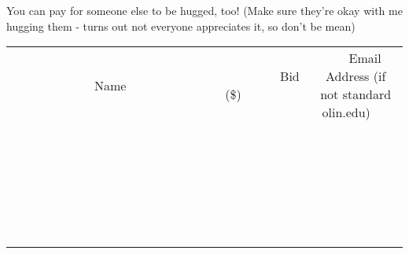 \documentclass[11pt]{article}
\begin{document}
You can pay for someone else to be hugged, too! (Make sure they're okay with me hugging them - turns out not everyone appreciates it, so don't be mean) \\
					[6ex]
					\begin{tabular}{c c c}
						~~~~~~~~~~~~~Name~~~~~~~~~~~~~ & ~~~~~~~~~Bid (\$)~~~~~~~~~ & ~~~Email Address (if not standard olin.edu)~~~ \\
				
 & & \\
\hline
 & & \\
\hline
 & & \\
\hline
 & & \\
\hline
 & & \\
\hline
 & & \\
\hline
 & & \\
\hline
 & & \\
\hline
 & & \\
\hline
 & & \\
\hline
 & & \\
\hline
 & & \\
\hline
 & & \\
\hline
 & & \\
\hline
 & & \\
\hline
 & & \\
\hline
 & & \\
\hline
 & & \\
\hline
 & & \\
\hline
 & & \\
\hline
 & & \\
\hline
 & & \\
\hline
 & & \\
\hline
 & & \\
\hline
 & & \\
\hline
 & & \\
\hline
					\end{tabular}
					\clearpage
				
\end{document}
